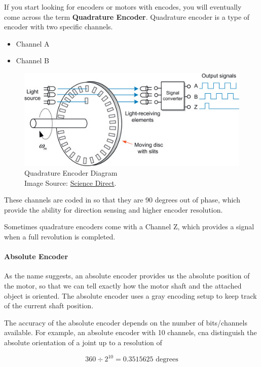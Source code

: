 \documentclass[paper=a4, fontsize=11pt]{article} %
\providecommand{\tightlist}{%
  \setlength{\itemsep}{0pt}\setlength{\parskip}{0pt}}
\numberwithin{equation}{section} %
\numberwithin{figure}{section} %
\numberwithin{table}{section} %
\begin{document}
If you start looking for encoders or motors with encodes, you will
eventually come across the term \textbf{Quadrature Encoder}. Quadrature
encoder is a type of encoder with two specific channels.

\begin{itemize}
\tightlist
\item
  Channel A
\item
  Channel B
\end{itemize}

\begin{figure}[H]
\centering
\includegraphics[width = 0.8 \textwidth]{2019-08-05-21-00-32.png}
\caption{Quadrature Encoder Diagram \\
Image Source:
\href{https://www.sciencedirect.com/topics/engineering/incremental-encoder}{Science
Direct}.}
\end{figure}

These channels are coded in so that they are 90 degrees out of phase,
which provide the ability for direction sensing and higher encoder
resolution.

Sometimes quadrature encoders come with a Channel Z, which provides a
signal when a full revolution is completed.

\hypertarget{absolute-encoder}{%
\paragraph{Absolute Encoder}\label{absolute-encoder}}

As the name suggests, an absolute encoder provides us the absolute
position of the motor, so that we can tell exactly how the motor shaft
and the attached object is oriented. The absolute encoder uses a gray
encoding setup to keep track of the current shaft position.

The accuracy of the absolute encoder depends on the number of
bits/channels available. For example, an absolute encoder with 10
channels, cna distinguish the absolute orientation of a joint up to a
resolution of

\begin{equation*}
    360 \div 2^{10} = 0.3515625 \text{ degrees}
\end{equation*}
\end{document}
